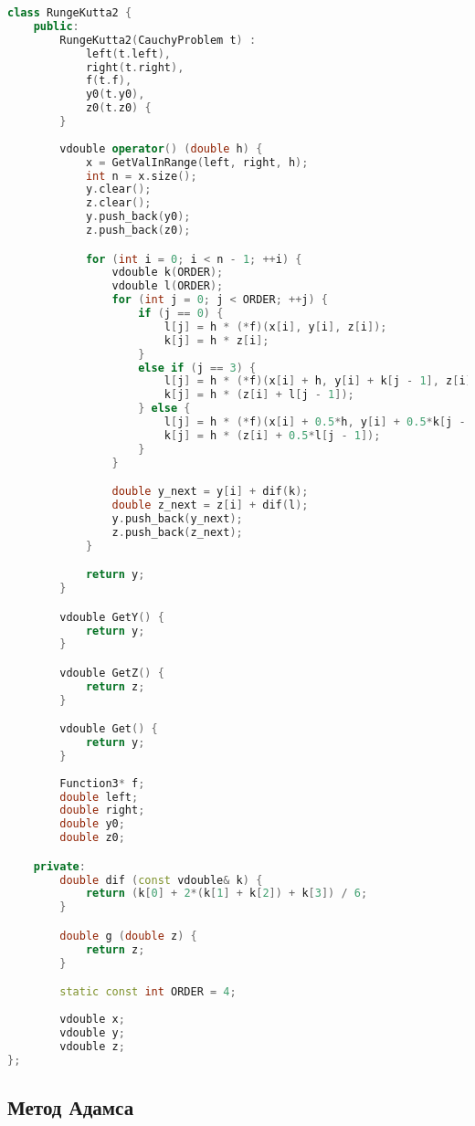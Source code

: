 \begin{lstlisting}[language=C++]
    class RungeKutta2 {
    public:
        RungeKutta2(CauchyProblem t) :
            left(t.left),
            right(t.right),
            f(t.f),
            y0(t.y0),
            z0(t.z0) {
        }
        
        vdouble operator() (double h) {
            x = GetValInRange(left, right, h);
            int n = x.size();
            y.clear();
            z.clear();
            y.push_back(y0);
            z.push_back(z0);

            for (int i = 0; i < n - 1; ++i) {
                vdouble k(ORDER);
                vdouble l(ORDER);
                for (int j = 0; j < ORDER; ++j) {
                    if (j == 0) {
                        l[j] = h * (*f)(x[i], y[i], z[i]);
                        k[j] = h * z[i];
                    }
                    else if (j == 3) {
                        l[j] = h * (*f)(x[i] + h, y[i] + k[j - 1], z[i] + l[j - 1]);
                        k[j] = h * (z[i] + l[j - 1]);
                    } else {
                        l[j] = h * (*f)(x[i] + 0.5*h, y[i] + 0.5*k[j - 1], z[i] + 0.5*l[j - 1]);
                        k[j] = h * (z[i] + 0.5*l[j - 1]);
                    }
                }

                double y_next = y[i] + dif(k);
                double z_next = z[i] + dif(l);
                y.push_back(y_next);
                z.push_back(z_next);
            }

            return y;
        }

        vdouble GetY() {
            return y;
        }

        vdouble GetZ() {
            return z;
        }

        vdouble Get() {
            return y;
        }
        
        Function3* f;
        double left;
        double right;
        double y0;
        double z0;

    private:
        double dif (const vdouble& k) {
            return (k[0] + 2*(k[1] + k[2]) + k[3]) / 6;
        }

        double g (double z) {
            return z;
        }

        static const int ORDER = 4;
        
        vdouble x;
        vdouble y;
        vdouble z;
};
\end{lstlisting}

\subsection*{Метод Адамса}

